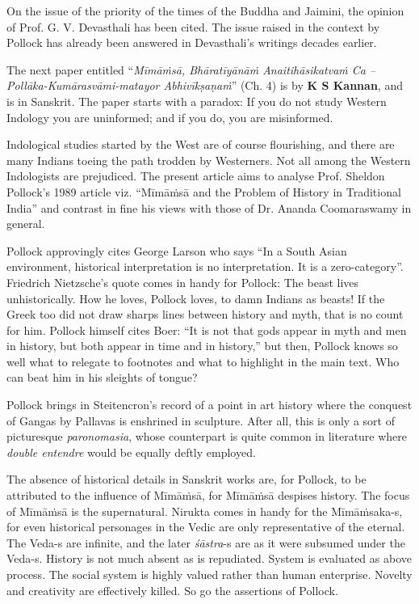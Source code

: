 On the issue of the priority of the times of the Buddha and Jaimini, the opinion of Prof. G. V. Devasthali has been cited. The issue raised in the context by Pollock has already been answered in Devasthali’s writings decades earlier. 

The next paper entitled “\textit{Mīmāṁsā, Bhāratīyānāṁ Anaitihāsikatvaṁ Ca – Pollāka-Kumārasvāmi-matayor Abhivīkṣaṇaṁ}” (Ch. 4) is by \textbf{K S Kannan}, and is in Sanskrit. The paper starts with a paradox: If you do not study Western Indology you are uninformed; and if you do, you are misinformed.

Indological studies started by the West are of course flourishing, and there are many Indians toeing the path trodden by Westerners. Not all among the Western Indologists are prejudiced. The present article aims to analyse Prof. Sheldon Pollock’s 1989 article viz. “Mīmāṁsā and the Problem of History in Traditional India” and contrast in fine his views with those of Dr. Ananda Coomaraswamy in general.

 Pollock approvingly cites George Larson who says “In a South Asian environment, historical interpretation is no interpretation. It is a zero-category”. Friedrich Nietzsche’s quote comes in handy for Pollock: The beast lives unhistorically. How he loves, Pollock loves, to damn Indians as beasts! If the Greek too did not draw sharps lines between history and myth, that is no count for him. Pollock himself cites Boer: “It is not that gods appear in myth and men in history, but both appear in time and in history,” but then, Pollock knows so well what to relegate to footnotes and what to highlight in the main text. Who can beat him in his sleights of tongue?

Pollock brings in Steitencron’s record of a point in art history where the conquest of Gangas by Pallavas is enshrined in sculpture. After all, this is only a sort of picturesque \textit{paronomasia}, whose counterpart is quite common in literature where \textit{double entendre} would be equally deftly employed. 

The absence of historical details in Sanskrit works are, for Pollock, to be attributed to the influence of Mīmāṁsā, for Mīmāṁsā despises history. The focus of Mīmāṁsā is the supernatural. Nirukta comes in handy for the Mīmāṁsaka-s, for even historical personages in the Vedic are only representative of the eternal. The Veda-s are infinite, and the later \textit{śāstra}-s are as it were subsumed under the Veda-s. History is not much absent as is repudiated. System is evaluated as above process. The social system is highly valued rather than human enterprise. Novelty and creativity are effectively killed. So go the assertions of Pollock.

